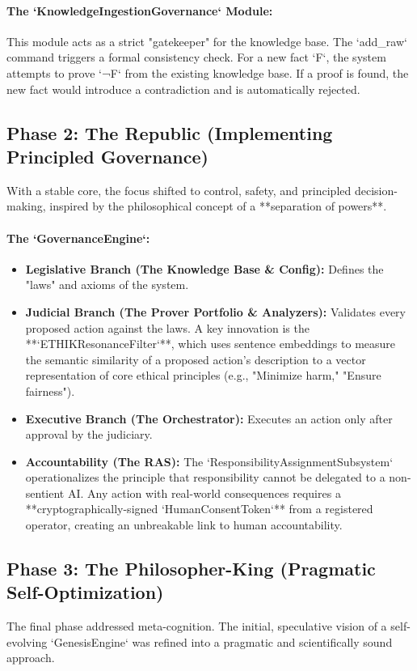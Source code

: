 \documentclass[11pt, a4paper]{article}
\begin{document}
\paragraph{The `KnowledgeIngestionGovernance` Module:} This module acts as a strict "gatekeeper" for the knowledge base. The `add_raw` command triggers a formal consistency check. For a new fact `F`, the system attempts to prove `¬F` from the existing knowledge base. If a proof is found, the new fact would introduce a contradiction and is automatically rejected.

\subsection{Phase 2: The Republic (Implementing Principled Governance)}
\label{subsec:republic}

With a stable core, the focus shifted to control, safety, and principled decision-making, inspired by the philosophical concept of a **separation of powers**.

\paragraph{The `GovernanceEngine`:}
\begin{itemize}
    \item \textbf{Legislative Branch (The Knowledge Base \& Config):} Defines the "laws" and axioms of the system.
    \item \textbf{Judicial Branch (The Prover Portfolio \& Analyzers):} Validates every proposed action against the laws. A key innovation is the **`ETHIKResonanceFilter`**, which uses sentence embeddings to measure the semantic similarity of a proposed action's description to a vector representation of core ethical principles (e.g., "Minimize harm," "Ensure fairness").
    \item \textbf{Executive Branch (The Orchestrator):} Executes an action only after approval by the judiciary.
    \item \textbf{Accountability (The RAS):} The `ResponsibilityAssignmentSubsystem` operationalizes the principle that responsibility cannot be delegated to a non-sentient AI. Any action with real-world consequences requires a **cryptographically-signed `HumanConsentToken`** from a registered operator, creating an unbreakable link to human accountability.
\end{itemize}

\subsection{Phase 3: The Philosopher-King (Pragmatic Self-Optimization)}
\label{subsec:philosopherking}
The final phase addressed meta-cognition. The initial, speculative vision of a self-evolving `GenesisEngine` was refined into a pragmatic and scientifically sound approach.
\end{document}
